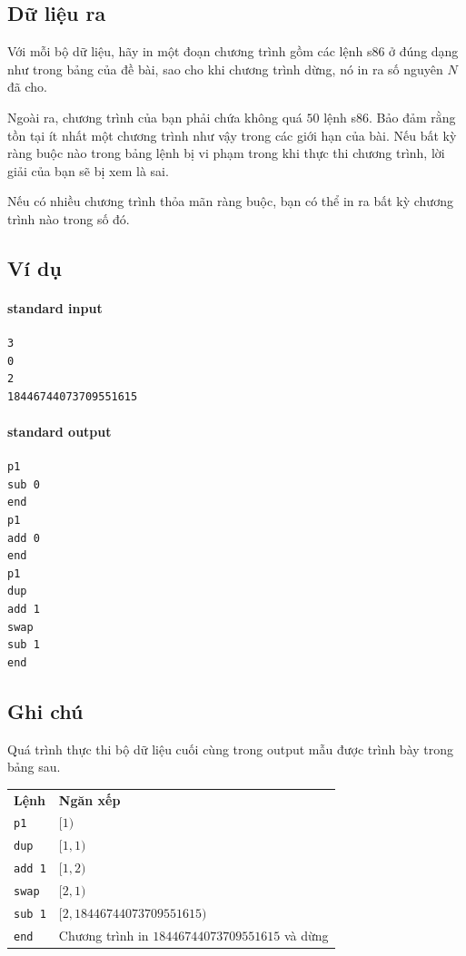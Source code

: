 \documentclass[11pt]{article}
\begin{document}
\subsection*{Dữ liệu ra}

Với mỗi bộ dữ liệu, hãy in một đoạn chương trình gồm các lệnh s86 ở đúng dạng
như trong bảng của đề bài, sao cho khi chương trình dừng, nó in ra số nguyên
\(N\) đã cho.

Ngoài ra, chương trình của bạn phải chứa không quá \(50\) lệnh s86. Bảo đảm
rằng tồn tại ít nhất một chương trình như vậy trong các giới hạn của bài. Nếu
bất kỳ ràng buộc nào trong bảng lệnh bị vi phạm trong khi thực thi chương
trình, lời giải của bạn sẽ bị xem là sai.

Nếu có nhiều chương trình thỏa mãn ràng buộc, bạn có thể in ra bất kỳ chương
trình nào trong số đó.

\subsection*{Ví dụ}

\paragraph{standard input}
\begin{verbatim}
3
0
2
18446744073709551615
\end{verbatim}

\paragraph{standard output}
\begin{verbatim}
p1
sub 0
end
p1
add 0
end
p1
dup
add 1
swap
sub 1
end
\end{verbatim}

\subsection*{Ghi chú}

Quá trình thực thi bộ dữ liệu cuối cùng trong output mẫu được trình bày trong
bảng sau.

\begin{center}
\begin{tabular}{ll}
\textbf{Lệnh} & \textbf{Ngăn xếp}\\
\texttt{p1} & \([1)\)\\
\texttt{dup} & \([1,1)\)\\
\texttt{add 1} & \([1,2)\)\\
\texttt{swap} & \([2,1)\)\\
\texttt{sub 1} & \([2,18446744073709551615)\)\\
\texttt{end} & Chương trình in \(18446744073709551615\) và dừng
\end{tabular}
\end{center}
\end{document}
